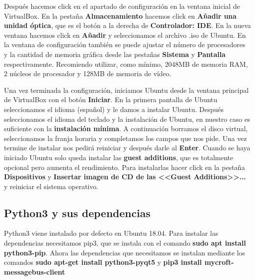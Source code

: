  

Después hacemos click en el apartado de configuración en la ventana inicial de VirtualBox. En la pestaña \textbf{Almacenamiento} hacemos click en \textbf{Añadir una unidad óptica}, que es el botón a la derecha de \textbf{Controlador: IDE}. En la nueva ventana hacemos click en \textbf{Añadir} y seleccionamos el archivo .iso de Ubuntu. En la ventana de configuración también se puede ajustar el número de procesadores y la cantidad de memoria gráfica desde las pestañas \textbf{Sistema} y \textbf{Pantalla} respectivamente. Recomiendo utilizar, como mínimo, 2048MB de memoria RAM, 2 núcleos de procesador y 128MB de memoria de vídeo.

 

Una vez terminada la configuración, iniciamos Ubuntu desde la ventana principal de VirtualBox con el botón \textbf{Iniciar}. En la primera pantalla de Ubuntu seleccionamos el idioma (español) y le damos a instalar Ubuntu.
Después seleccionamos el idioma del teclado y la instalación de Ubuntu, en nuestro caso es suficiente con la \textbf{instalación mínima}. A continuación borramos el disco virtual, seleccionamos la franja horaria y completamos los campos que nos pide. Una vez termine de instalar nos pedirá reiniciar y después darle al \textbf{Enter}. Cuando se haya iniciado Ubuntu solo queda instalar las \textbf{guest additions}, que es totalmente opcional pero aumenta el rendimiento. Para instalarlas hacer click en la pestaña \textbf{Dispositivos} y \textbf{Insertar imagen de CD de las <<Guest Additions>>...} y reiniciar el sistema operativo.

 

\subsection{Python3 y sus dependencias}

Python3 viene instalado por defecto en Ubuntu 18.04. Para instalar las dependencias necesitamos pip3, que se instala con el comando \textbf{sudo apt install python3-pip}. Ahora las dependencias que necesitamos se instalan mediante los comandos \textbf{sudo apt-get install python3-pyqt5} y \textbf{pip3 install mycroft-messagebus-client}

